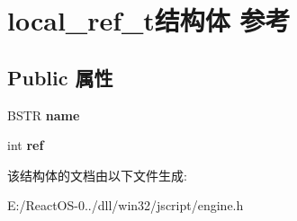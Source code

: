 \hypertarget{structlocal__ref__t}{}\section{local\+\_\+ref\+\_\+t结构体 参考}
\label{structlocal__ref__t}
\subsection*{Public 属性}
\begin{DoxyCompactItemize}
\item 
\mbox{\label{structlocal__ref__t_a5b5a72cfc9c1a2e4d24ace06a1b51384}} 
B\+S\+TR {\bfseries name}
\item 
\mbox{\label{structlocal__ref__t_a5796e48c0952d9d7dfb879d6436ccc99}} 
int {\bfseries ref}
\end{DoxyCompactItemize}


该结构体的文档由以下文件生成\+:\begin{DoxyCompactItemize}
\item 
E\+:/\+React\+O\+S-\/0../dll/win32/jscript/engine.\+h\end{DoxyCompactItemize}
